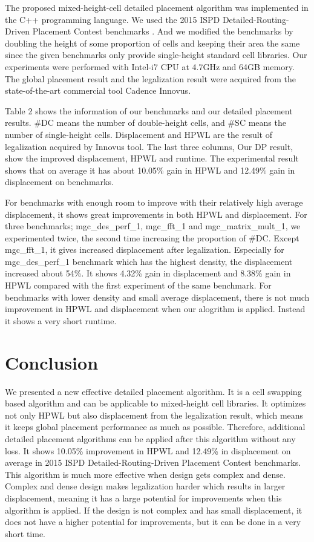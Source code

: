 \documentclass[sigconf,authordraft]{acmart}
\begin{document}
 The proposed mixed-height-cell detailed placement algorithm was implemented in the C++ programming language. We used the 2015 ISPD Detailed-Routing-Driven Placement Contest benchmarks \cite{bustany2015ispd}. And we modified the benchmarks by doubling the height of some proportion of cells and keeping their area the same since the given benchmarks only provide single-height standard cell libraries. Our experiments were performed with Intel-i7 CPU at 4.7GHz and 64GB memory. The global placement result and the legalization result were acquired from the state-of-the-art commercial tool Cadence Innovus. 
 
 Table 2 shows the information of our benchmarks and our detailed placement results. \#DC means the number of double-height cells, and \#SC means the number of single-height cells. Displacement and HPWL are the result of legalization acquired by Innovus tool. The last three columns, Our DP result, show the improved displacement, HPWL and runtime. The experimental result shows that on average it has about 10.05\% gain in HPWL and 12.49\% gain in displacement on benchmarks. 
 
 For benchmarks with enough room to improve with their relatively high average displacement, it shows great improvements in both HPWL and displacement. For three benchmarks; mgc\_des\_perf\_1, mgc\_fft\_1 and mgc\_matrix\_mult\_1, we experimented twice, the second time increasing the proportion of \#DC. Except mgc\_fft\_1, it gives increased displacement after legalization. Especially for mgc\_des\_perf\_1 benchmark which has the highest density, the displacement increased about 54\%. It shows 4.32\% gain in displacement and 8.38\% gain in HPWL compared with the first experiment of the same benchmark. For benchmarks with lower density and small average displacement, there is not much improvement in HPWL and displacement when our alogrithm is applied. Instead it shows a very short runtime.   

\section{Conclusion}

We presented a new effective detailed placement algorithm. It is a cell swapping based algorithm and can be applicable to mixed-height cell libraries. It optimizes not only HPWL but also displacement from the legalization result, which means it keeps global placement performance as much as possible. Therefore, additional detailed placement algorithms can be applied after this algorithm without any loss. It shows 10.05\% improvement in HPWL and 12.49\% in displacement on average in 2015 ISPD Detailed-Routing-Driven Placement Contest benchmarks. This algorithm is much more effective when design gets complex and dense. Complex and dense design makes legalization harder which results in larger displacement, meaning it has a large potential for improvements when this algorithm is applied. If the design is not complex and has small displacement, it does not have a higher potential for improvements, but it can be done in a very short time. 



\end{document}
